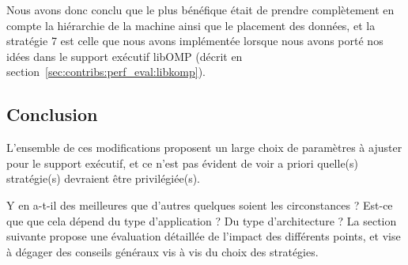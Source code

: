 Nous avons donc conclu que le plus bénéfique était de prendre complètement en compte la hiérarchie de la machine ainsi que le placement des données, et la stratégie 7 est celle que nous avons implémentée lorsque nous avons porté nos idées dans le support exécutif libOMP (décrit en section~\ref{sec:contribs:perf_eval:libkomp}).


\subsection*{Conclusion}

L'ensemble de ces modifications proposent un large choix de paramètres à ajuster pour le support exécutif, et ce n'est pas évident de voir a priori quelle(s) stratégie(s) devraient être privilégiée(s).

Y en a-t-il des meilleures que d'autres quelques soient les circonstances ?
Est-ce que que cela dépend du type d'application ? Du type d'architecture ?
La section suivante propose une évaluation détaillée de l'impact des différents points, et vise à dégager des conseils généraux vis à vis du choix des stratégies.

